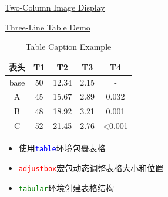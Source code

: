 \documentclass[11pt,aspectratio=43,xcolor={dvipsnames},hyperref={pdftex,pdfpagemode=UseNone,hidelinks,pdfdisplaydoctitle=true},usepdftitle=false]{ctexbeamer}
\begin{document}
\begin{frame}{\underline{Two-Column Image Display}}
  \vspace{0.5cm}
\end{frame}

\begin{frame}{\underline{Three-Line Table Demo}}
  \centering
  
\begin{table}[h]
  \centering
  \caption{Table Caption Example}
  \begin{adjustbox}{width=0.5\textwidth,center}
    \begin{tabular}{c|c|c|c|c}
      \toprule
      \textbf{表头} & \textbf{T1} & \textbf{T2} & \textbf{T3} & \textbf{T4} \\
      \midrule
      base & 50 & 12.34 & 2.15 & - \\
      A & 45 & 15.67 & 2.89 & 0.032 \\
      B & 48 & 18.92 & 3.21 & 0.001 \\
      C & 52 & 21.45 & 2.76 & <0.001 \\
      \bottomrule
    \end{tabular}
  \end{adjustbox}
\end{table} 
  \vspace{0.3cm}
  
  \begin{itemize}
    \item 使用\texttt{\textcolor{blue}{table}}环境包裹表格
    \item \texttt{\textcolor{red}{adjustbox}}宏包动态调整表格大小和位置
    \item \texttt{\textcolor{green}{tabular}}环境创建表格结构
  \end{itemize}
\end{frame}

\begin{frame}
  \begin{center}
    \Huge{}
  \end{center}
\end{frame}
\end{document}
